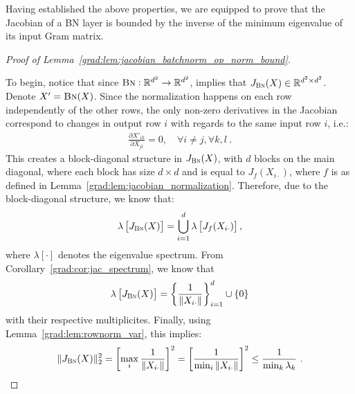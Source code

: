 Having established the above properties, we are equipped to prove that the Jacobian of a BN layer is bounded by the inverse of the minimum eigenvalue of its input Gram matrix. 

\begin{proof}[Proof of Lemma~\ref{grad:lem:jacobian_batchnorm_op_norm_bound}]
\label{grad:proof:jacobian_batchnorm_op_norm_bound}

To begin, notice that since $\text{\sc{Bn}}: \mathbb{R}^{d^2} \to \mathbb{R}^{d^2}$, implies that $J_{\text{\sc{Bn}}}(X) \in \mathbb{R}^{d^2 \times d^2}$. Denote $X' = \text{\sc{Bn}}(X)$. Since the normalization happens on each row independently of the other rows, the only non-zero derivatives in the Jacobian correspond to changes in output row $i$ with regards to the same input row $i$, i.e.:
\begin{align}
    \frac{\partial X'_{ik}}{\partial X_{jl}} = 0, \quad \forall i \neq j, \forall k, l~.
\end{align}
This creates a block-diagonal structure in $J_{\text{\sc{Bn}}}(X)$, with $d$ blocks on the main diagonal, where each block has size $d \times d$ and is equal to $J_f(X_{i\cdot})$, where $f$ is as defined in Lemma~\ref{grad:lem:jacobian_normalization}. Therefore, due to the block-diagonal structure, we know that: 
\begin{align}
    \lambda \left[J_{\text{\sc{Bn}}}(X)\right] = \bigcup_{i=1}^d \lambda \left[J_f(X_{i\cdot})\right],
\end{align}
where $\lambda[\cdot]$ denotes the eigenvalue spectrum. From Corollary~\ref{grad:cor:jac_spectrum}, we know that
\begin{align}
    \lambda\left[J_{\text{\sc{Bn}}}(X)\right] = \left\{ \frac{1}{\|X_{i\cdot}\|} \right\}_{i=1}^d \cup \{0\}
\end{align}
with their respective multiplicites. Finally, using Lemma~\ref{grad:lem:rownorm_var}, this implies:
\begin{align}
    \| J_{\text{\sc{Bn}}}(X) \|_2^2 = \left[\max_i \frac{1}{\|X_{i\cdot}\|}\right]^2 = \left[\frac{1}{\min_i {\|X_{i\cdot}\|}}\right]^2
    \leq \frac{1}{\min_k \lambda_k}~.
\end{align}
\end{proof}

